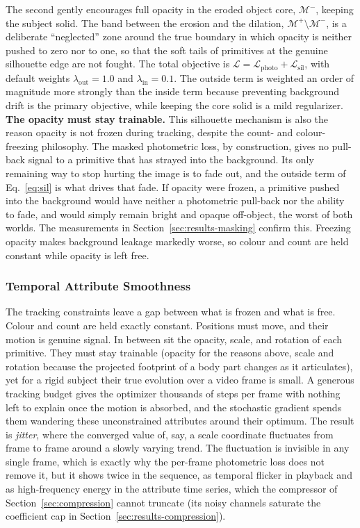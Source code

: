 The second gently encourages full opacity in the eroded object core,
$\mathcal{M}^{-}$, keeping the subject solid. The band between the erosion and the
dilation, $\mathcal{M}^{+}\setminus\mathcal{M}^{-}$, is a deliberate \enquote{neglected}
zone around the true boundary in which opacity is neither pushed to zero nor to one,
so that the soft tails of primitives at the genuine silhouette edge are not fought.
The total objective is $\mathcal{L} = \mathcal{L}_{\text{photo}} +
\mathcal{L}_{\text{sil}}$, with default weights $\lambda_{\text{out}} = 1.0$ and
$\lambda_{\text{in}} = 0.1$. The outside term is weighted an order of magnitude more
strongly than the inside term because preventing background drift is the primary
objective, while keeping the core solid is a mild regularizer. \textbf{The opacity must stay trainable.} This silhouette mechanism is also the
reason opacity is not frozen during tracking, despite the count- and
colour-freezing philosophy. The masked photometric loss, by construction, gives no
pull-back signal to a primitive that has strayed into the background. Its only
remaining way to stop hurting the image is to fade out, and the outside term of
Eq.~\eqref{eq:sil} is what drives that fade. If opacity were frozen, a
primitive pushed into the background would have neither a photometric pull-back nor
the ability to fade, and would simply remain bright and opaque off-object, the
worst of both worlds. The measurements in Section~\ref{sec:results-masking} confirm
this. Freezing opacity makes background leakage markedly worse, so colour and
count are held constant while opacity is left free.

\subsubsection{Temporal Attribute Smoothness}
\label{sec:smoothness}

The tracking constraints leave a gap between what is frozen and what is free. Colour
and count are held exactly constant. Positions must move, and their motion is genuine
signal. In between sit the opacity, scale, and rotation of each primitive. They must
stay trainable (opacity for the reasons above, scale and rotation because the
projected footprint of a body part changes as it articulates), yet for a rigid subject
their true evolution over a video frame is small. A generous tracking budget
gives the optimizer thousands of steps per frame with nothing left to explain once the
motion is absorbed, and the stochastic gradient spends them wandering these
unconstrained attributes around their optimum. The result is \emph{jitter}, where the
converged value of, say, a scale coordinate fluctuates from frame to frame around a
slowly varying trend. The fluctuation is invisible in any single frame, which is
exactly why the per-frame photometric loss does not remove it, but it shows twice in
the sequence, as temporal flicker in playback and as high-frequency energy in the
attribute time series, which the compressor of
Section~\ref{sec:compression} cannot truncate (its noisy channels saturate the
coefficient cap in Section~\ref{sec:results-compression}).

